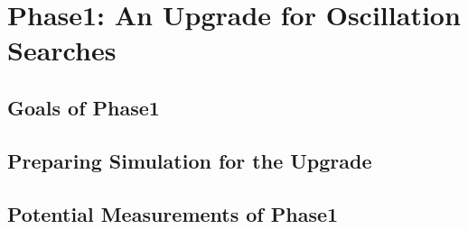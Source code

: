 \chapter{Phase1: An Upgrade for Oscillation Searches}

\section{Goals of Phase1}

\section{Preparing Simulation for the Upgrade}

\section{Potential Measurements of Phase1}

